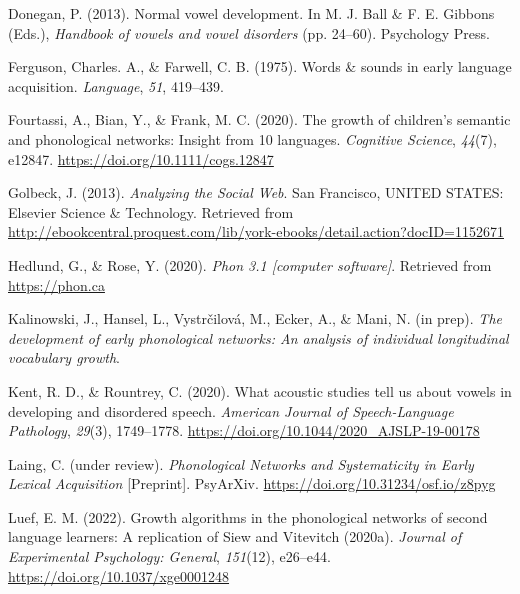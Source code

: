 \documentclass[
  man]{apa6}
\newlength{\cslhangindent}
\newlength{\cslentryspacingunit} %
\newenvironment{CSLReferences}[2] %
 {%
  \setlength{\parindent}{0pt}
  \ifodd #1
  \let\oldpar\par
  \def\par{\hangindent=\cslhangindent\oldpar}
  \fi
  \setlength{\parskip}{#2\cslentryspacingunit}
 }%
 {}
\begin{document}
\begin{CSLReferences}{1}{0}
\leavevmode{}%
Donegan, P. (2013). Normal vowel development. In M. J. Ball \& F. E. Gibbons (Eds.), \emph{Handbook of vowels and vowel disorders} (pp. 24--60). Psychology Press.

\leavevmode{}%
Ferguson, Charles. A., \& Farwell, C. B. (1975). Words \& sounds in early language acquisition. \emph{Language}, \emph{51}, 419--439.

\leavevmode{}%
Fourtassi, A., Bian, Y., \& Frank, M. C. (2020). The growth of children's semantic and phonological networks: Insight from 10 languages. \emph{Cognitive Science}, \emph{44}(7), e12847. \url{https://doi.org/10.1111/cogs.12847}

\leavevmode{}%
Golbeck, J. (2013). \emph{Analyzing the {Social} {Web}}. San Francisco, UNITED STATES: Elsevier Science \& Technology. Retrieved from \url{http://ebookcentral.proquest.com/lib/york-ebooks/detail.action?docID=1152671}

\leavevmode{}%
Hedlund, G., \& Rose, Y. (2020). \emph{Phon 3.1 {[}computer software{]}}. Retrieved from \url{https://phon.ca}

\leavevmode{}%
Kalinowski, J., Hansel, L., Vystrčilová, M., Ecker, A., \& Mani, N. (in prep). \emph{The development of early phonological networks: {An} analysis of individual longitudinal vocabulary growth}.

\leavevmode{}%
Kent, R. D., \& Rountrey, C. (2020). What acoustic studies tell us about vowels in developing and disordered speech. \emph{American Journal of Speech-Language Pathology}, \emph{29}(3), 1749--1778. \url{https://doi.org/10.1044/2020_AJSLP-19-00178}

\leavevmode{}%
Laing, C. (under review). \emph{Phonological {Networks} and {Systematicity} in {Early} {Lexical} {Acquisition}} {[}Preprint{]}. PsyArXiv. \url{https://doi.org/10.31234/osf.io/z8pyg}

\leavevmode{}%
Luef, E. M. (2022). Growth algorithms in the phonological networks of second language learners: {A} replication of {Siew} and {Vitevitch} (2020a). \emph{Journal of Experimental Psychology: General}, \emph{151}(12), e26--e44. \url{https://doi.org/10.1037/xge0001248}


\end{CSLReferences}
\end{document}
